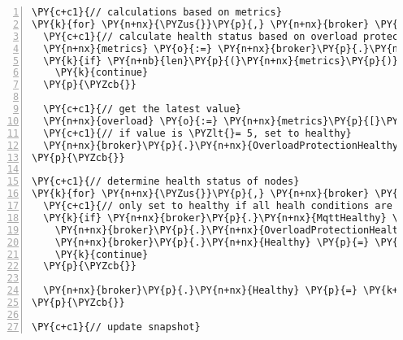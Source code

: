 \begin{Verbatim}[commandchars=\\\{\},numbers=left,firstnumber=1,stepnumber=1,frame=single]
\PY{c+c1}{// calculations based on metrics}
\PY{k}{for} \PY{n+nx}{\PYZus{}}\PY{p}{,} \PY{n+nx}{broker} \PY{o}{:=} \PY{k}{range} \PY{n+nx}{endpoints} \PY{p}{\PYZob{}}
  \PY{c+c1}{// calculate health status based on overload protection}
  \PY{n+nx}{metrics} \PY{o}{:=} \PY{n+nx}{broker}\PY{p}{.}\PY{n+nx}{Metrics}\PY{p}{[}\PY{n+nx}{Metrics}\PY{p}{.}\PY{n+nx}{OverloadProtection}\PY{p}{]}
  \PY{k}{if} \PY{n+nb}{len}\PY{p}{(}\PY{n+nx}{metrics}\PY{p}{)} \PY{p}{\PYZlt{}} \PY{l+m+mi}{1} \PY{p}{\PYZob{}}
    \PY{k}{continue}
  \PY{p}{\PYZcb{}}

  \PY{c+c1}{// get the latest value}
  \PY{n+nx}{overload} \PY{o}{:=} \PY{n+nx}{metrics}\PY{p}{[}\PY{n+nb}{len}\PY{p}{(}\PY{n+nx}{metrics}\PY{p}{)}\PY{o}{\PYZhy{}}\PY{l+m+mi}{1}\PY{p}{]}
  \PY{c+c1}{// if value is \PYZlt{}= 5, set to healthy}
  \PY{n+nx}{broker}\PY{p}{.}\PY{n+nx}{OverloadProtectionHealthy} \PY{p}{=} \PY{n+nx}{overload}\PY{p}{.}\PY{n+nx}{Value} \PY{o}{\PYZlt{}=} \PY{l+m+mf}{5.0}
\PY{p}{\PYZcb{}}

\PY{c+c1}{// determine health status of nodes}
\PY{k}{for} \PY{n+nx}{\PYZus{}}\PY{p}{,} \PY{n+nx}{broker} \PY{o}{:=} \PY{k}{range} \PY{n+nx}{endpoints} \PY{p}{\PYZob{}}
  \PY{c+c1}{// only set to healthy if all healh conditions are met}
  \PY{k}{if} \PY{n+nx}{broker}\PY{p}{.}\PY{n+nx}{MqttHealthy} \PY{o}{\PYZam{}\PYZam{}}
    \PY{n+nx}{broker}\PY{p}{.}\PY{n+nx}{OverloadProtectionHealthy} \PY{p}{\PYZob{}}
    \PY{n+nx}{broker}\PY{p}{.}\PY{n+nx}{Healthy} \PY{p}{=} \PY{k+kc}{true}
    \PY{k}{continue}
  \PY{p}{\PYZcb{}}

  \PY{n+nx}{broker}\PY{p}{.}\PY{n+nx}{Healthy} \PY{p}{=} \PY{k+kc}{false}
\PY{p}{\PYZcb{}}

\PY{c+c1}{// update snapshot}
\end{Verbatim}
